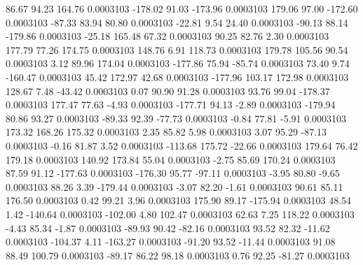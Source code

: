        86.67       94.23      164.76     0.0003103
     -178.02       91.03     -173.96     0.0003103
      179.06       97.00     -172.60     0.0003103
      -87.33       83.94       80.80     0.0003103
      -22.81        9.54       24.40     0.0003103
      -90.13       88.14     -179.86     0.0003103
      -25.18      165.48       67.32     0.0003103
       90.25       82.76        2.30     0.0003103
      177.79       77.26      174.75     0.0003103
      148.76        6.91      118.73     0.0003103
      179.78      105.56       90.54     0.0003103
        3.12       89.96      174.04     0.0003103
     -177.86       75.94      -85.74     0.0003103
       73.40        9.74     -160.47     0.0003103
       45.42      172.97       42.68     0.0003103
     -177.96      103.17      172.98     0.0003103
      128.67        7.48      -43.42     0.0003103
        0.07       90.90       91.28     0.0003103
       93.76       99.04     -178.37     0.0003103
      177.47       77.63       -4.93     0.0003103
     -177.71       94.13       -2.89     0.0003103
     -179.94       80.86       93.27     0.0003103
      -89.33       92.39      -77.73     0.0003103
       -0.84       77.81       -5.91     0.0003103
      173.32      168.26      175.32     0.0003103
        2.35       85.82        5.98     0.0003103
        3.07       95.29      -87.13     0.0003103
       -0.16       81.87        3.52     0.0003103
     -113.68      175.72      -22.66     0.0003103
      179.64       76.42      179.18     0.0003103
      140.92      173.84       55.04     0.0003103
       -2.75       85.69      170.24     0.0003103
       87.59       91.12     -177.63     0.0003103
     -176.30       95.77      -97.11     0.0003103
       -3.95       80.80       -9.65     0.0003103
       88.26        3.39     -179.44     0.0003103
       -3.07       82.20       -1.61     0.0003103
       90.61       85.11      176.50     0.0003103
        0.42       99.21        3.96     0.0003103
      175.90       89.17     -175.94     0.0003103
       48.54        1.42     -140.64     0.0003103
     -102.00        4.80      102.47     0.0003103
       62.63        7.25      118.22     0.0003103
       -4.43       85.34       -1.87     0.0003103
      -89.93       90.42      -82.16     0.0003103
       93.52       82.32      -11.62     0.0003103
     -104.37        4.11     -163.27     0.0003103
      -91.20       93.52      -11.44     0.0003103
       91.08       88.49      100.79     0.0003103
      -89.17       86.22       98.18     0.0003103
        0.76       92.25      -81.27     0.0003103
